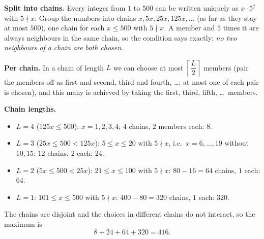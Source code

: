 \textbf{Split into chains.} Every integer from $1$ to $500$ can be written uniquely as $x\cdot5^j$ with $5\nmid x$. Group the numbers into chains $x,5x,25x,125x,\dots$ (as far as they stay at most $500$), one chain for each $x\le500$ with $5\nmid x$. A member and $5$ times it are always neighbours in the same chain, so the condition says exactly: \emph{no two neighbours of a chain are both chosen.}

\textbf{Per chain.} In a chain of length $L$ we can choose at most $\left\lceil\dfrac {L}{2}\right\rceil$ members (pair the members off as first and second, third and fourth, \dots; at most one of each pair is chosen), and this many is achieved by taking the first, third, fifth, \dots\ members.

\textbf{Chain lengths.}
\begin{itemize}
\item $L=4$ ($125x\le500$): $x=1,2,3,4$; $4$ chains, $2$ members each: $8$.
\item $L=3$ ($25x\le500<125x$): $5\le x\le20$ with $5\nmid x$, i.e.\ $x=6,\dots,19$ without $10,15$: $12$ chains, $2$ each: $24$.
\item $L=2$ ($5x\le500<25x$): $21\le x\le100$ with $5\nmid x$: $80-16=64$ chains, $1$ each: $64$.
\item $L=1$: $101\le x\le500$ with $5\nmid x$: $400-80=320$ chains, $1$ each: $320$.
\end{itemize}
The chains are disjoint and the choices in different chains do not interact, so the maximum is
\[
8+24+64+320=\boxed{416}.
\]
